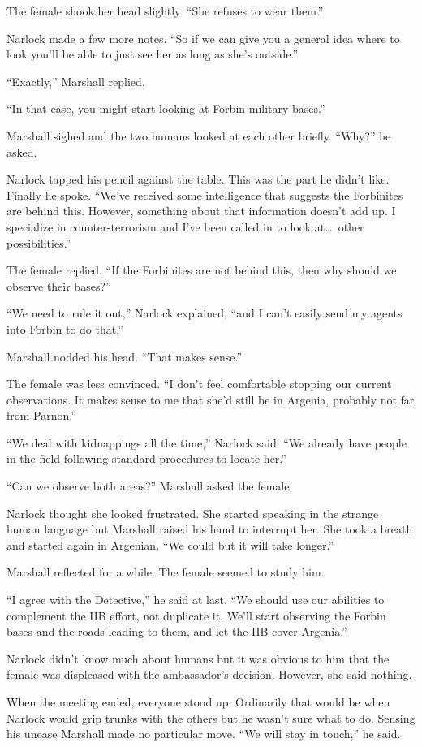 The female shook her head slightly. ``She refuses to wear them.''

Narlock made a few more notes. ``So if we can give you a general idea where to look you'll be
able to just see her as long as she's outside.''

``Exactly,'' Marshall replied.

``In that case, you might start looking at Forbin military bases.''

Marshall sighed and the two humans looked at each other briefly. ``Why?'' he asked.

Narlock tapped his pencil against the table. This was the part he didn't like. Finally he spoke.
``We've received some intelligence that suggests the Forbinites are behind this. However,
something about that information doesn't add up. I specialize in counter-terrorism and I've been
called in to look at\ldots\ other possibilities.''

The female replied. ``If the Forbinites are not behind this, then why should we observe their
bases?''

``We need to rule it out,'' Narlock explained, ``and I can't easily send my agents into Forbin
to do that.''

Marshall nodded his head. ``That makes sense.''

The female was less convinced. ``I don't feel comfortable stopping our current observations. It
makes sense to me that she'd still be in Argenia, probably not far from Parnon.''

``We deal with kidnappings all the time,'' Narlock said. ``We already have people in the field
following standard procedures to locate her.''

``Can we observe both areas?'' Marshall asked the female.

Narlock thought she looked frustrated. She started speaking in the strange human language but
Marshall raised his hand to interrupt her. She took a breath and started again in Argenian. ``We
could but it will take longer.''

Marshall reflected for a while. The female seemed to study him.

``I agree with the Detective,'' he said at last. ``We should use our abilities to complement the
IIB effort, not duplicate it. We'll start observing the Forbin bases and the roads leading to
them, and let the IIB cover Argenia.''

Narlock didn't know much about humans but it was obvious to him that the female was displeased
with the ambassador's decision. However, she said nothing.

When the meeting ended, everyone stood up. Ordinarily that would be when Narlock would grip
trunks with the others but he wasn't sure what to do. Sensing his unease Marshall made no
particular move. ``We will stay in touch,'' he said.


